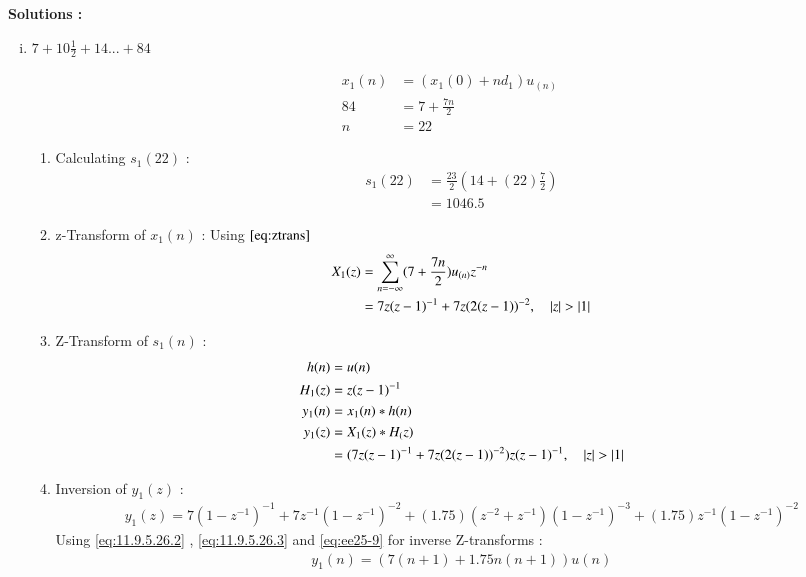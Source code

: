 \documentclass[journal,12pt,onecolumn]{IEEEtran}
\theoremstyle{remark}
\begin{document}
\textbf{Solutions :}

\begin{enumerate}[(i)]
\item
$ 7 + 10\frac{1}{2} + 14 ... + 84$
\vspace{0.5cm}

\begin{align}
x_1(n) &= (x_1(0) + nd_1)u_{(n)}\\
84 &= 7+\frac{7n}{2}\\
n &= 22
\end{align}

\begin{enumerate}[1.]
\item 
Calculating $s_1(22)$ : 
\begin{align}
    s_1{(22)} &= \frac{23}{2}(14+(22)\frac{7}{2})\\
     &= 1046.5
    \end{align}
    
\item 
z-Transform of $x_1(n)$ :
Using $\eqref{eq:ztrans}$
\begin{align}
X_1(z) &= \sum_{n=-\infty}^{\infty}(7 + \frac{7n}{2})u_{(n)}z^{-n} \\
&= 7z(z-1)^{-1} + 7z(2(z-1))^{-2}  \label{eq:ee25-4}
,\quad \left\vert z\right\vert>\left\vert1\right\vert 
\end{align}
\item
Z-Transform of $s_1(n)$ :
\begin{align}
         h(n) &= u(n) \\
                 H_1(z) &= z(z-1)^{-1} \label{eq:ee25-9}\\
    y_1(n) &= x_1(n) * h(n) \\
    y_1(z) &= X_1(z) * H_(z)\\
 &= (7z(z-1)^{-1}+
7z(2(z-1))^{-2})z(z-1)^{-1}
,\quad \left\vert z\right\vert>\left\vert1\right\vert     
\end{align}
        \item
Inversion of $y_1(z)$ :
\begin{align}
    y_1(z) = 7(1-z^{-1})^{-1} + 7z^{-1}(1-z^{-1})^{-2} + (1.75)(z^{-2} + z^{-1})(1-z^{-1})^{-3} + (1.75)z^{-1}(1-z^{-1})^{-2}  
\end{align}
Using \eqref{eq:11.9.5.26.2} , \eqref{eq:11.9.5.26.3} and \eqref{eq:ee25-9} for inverse Z-transforms :
\begin{align}
 y_1(n) = (7(n+1) + 1.75n(n+1))u(n)
\end{align}
\end{enumerate}    


\end{enumerate}
\end{document}
